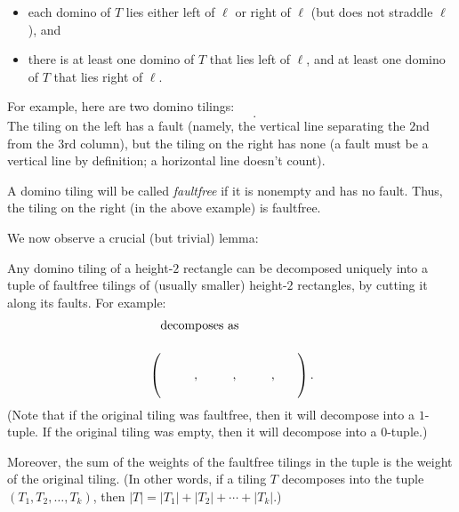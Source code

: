 \begin{itemize}
\item each domino of $T$ lies either left of $\ell$ or right of $\ell$ (but
does not straddle $\ell$), and

\item there is at least one domino of $T$ that lies left of $\ell$, and at
least one domino of $T$ that lies right of $\ell$.
\end{itemize}

For example, here are two domino tilings:%
\[%
\ \ \ \ \ \ \ \ \ \ \
\ \ \ \ \ \ .
\]
The tiling on the left has a fault (namely, the vertical line separating the
$2$nd from the $3$rd column), but the tiling on the right has none (a fault
must be a vertical line by definition; a horizontal line doesn't count).

A domino tiling will be called \emph{faultfree} if it is nonempty and has no
fault. Thus, the tiling on the right (in the above example) is faultfree.

We now observe a crucial (but trivial) lemma:

\begin{lemma}
\label{lem.gf.weighted-set.domino.fd}Any domino tiling of a height-$2$
rectangle can be decomposed uniquely into a tuple of faultfree tilings of
(usually smaller) height-$2$ rectangles, by cutting it along its faults. For
example:%
\begin{align*}
&  \raisebox{-3.5ex}{
}\ \text{ decomposes as}\\
&  \left(  \ \ \raisebox{-3.5ex}{
}\ \ \ \ \ ,\ \ \raisebox{-3.5ex}{
}\ \ \ \ \ ,\ \ \raisebox{-3.5ex}{
}\ \ \ \ \ ,\ \ \raisebox{-3.5ex}{
}\ \ \right)  .
\end{align*}
(Note that if the original tiling was faultfree, then it will decompose into a
$1$-tuple. If the original tiling was empty, then it will decompose into a $0$-tuple.)

Moreover, the sum of the weights of the faultfree tilings in the tuple is the
weight of the original tiling. (In other words, if a tiling $T$ decomposes
into the tuple $\left(  T_{1},T_{2},\ldots,T_{k}\right)  $, then $\left\vert
T\right\vert =\left\vert T_{1}\right\vert +\left\vert T_{2}\right\vert
+\cdots+\left\vert T_{k}\right\vert $.)
\end{lemma}

